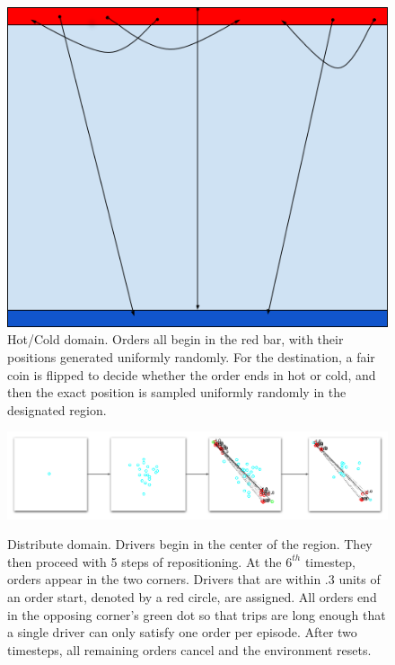 \begin{figure}[H]
\begin{floatrow}
\centering
\includegraphics[width=.75\linewidth]{sections/mddqn/figures/HotCold_cropped.png}
\caption{Hot/Cold domain. Orders all begin in the red bar, with their positions generated uniformly randomly. For the destination, a fair coin is flipped to decide whether the order ends in hot or cold, and then the exact position is sampled uniformly randomly in the designated region.}
\label{fig:hc}
\end{floatrow}
\end{figure}

\begin{figure}[H]
\begin{floatrow}
\centering
\includegraphics[width=.75\linewidth]{sections/mddqn/figures/distribute_domain.png}\label{fig:distribute}
\caption{Distribute domain. Drivers begin in the center of the region. They then proceed with 5 steps of repositioning. At the $6^{th}$ timestep, orders appear in the two corners. Drivers that are within .3 units of an order start, denoted by a red circle, are assigned. All orders end in the opposing corner’s green dot so that trips are long enough that a single driver can only satisfy one order per episode. After two timesteps, all remaining orders cancel and the environment resets.}
\end{floatrow}
\end{figure}

